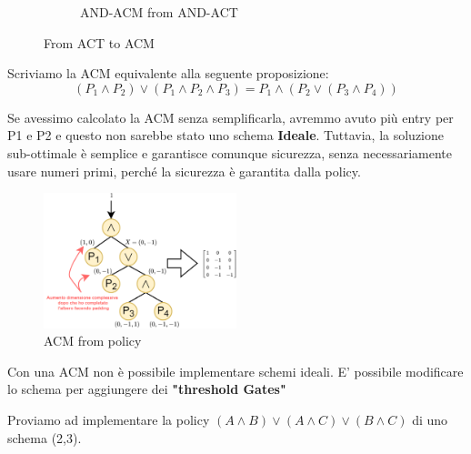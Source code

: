 \begin{figure}[ht]
\begin{subfigure}[b]{0.3\textwidth}
         \caption{AND-ACM from AND-ACT }
         \label{fig:and3acm}
     \end{subfigure}
        \caption{From ACT to ACM}
        \label{fig:actacm}
\end{figure}
\begin{example}
Scriviamo la ACM equivalente alla seguente proposizione: \[(P_1\land P_2)\lor (P_1\land P_2\land P_3)=P_1\land(P_2\lor (P_3\land P_4))\]
\begin{remark}
Se avessimo calcolato la ACM senza semplificarla, avremmo avuto più entry per P1 e P2 e questo non sarebbe stato uno schema \textbf{Ideale}. Tuttavia, la soluzione sub-ottimale è semplice e garantisce comunque sicurezza, senza necessariamente usare numeri primi, perché la sicurezza è garantita dalla policy.
\end{remark}
\end{example}
\begin{figure}[h]
    \centering
    \includegraphics[width=0.5\textwidth]{image/lsss/acmex.png}
    \caption{ACM from policy}
    \label{fig:acmpol}
\end{figure}
\begin{corollary}
Con una ACM non è possibile implementare schemi ideali. E' possibile modificare lo schema per aggiungere dei \textbf{"threshold Gates"}\end{corollary}
\begin{example}
Proviamo ad implementare la policy $(A\land B)\lor(A\land C)\lor(B\land C)$  di uno schema (2,3).
\end{example}